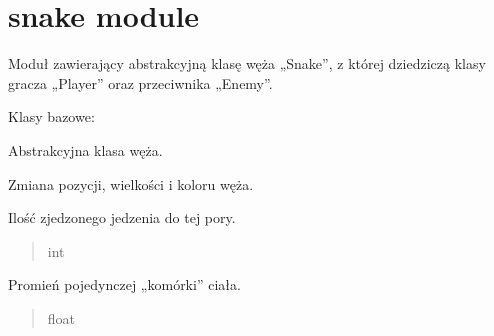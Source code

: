 \documentclass[letterpaper,10pt,polish]{sphinxmanual}
\begin{document}
\sphinxstepscope


\section{snake module}
\label{\detokenize{snake:module-snake}}\label{\detokenize{snake:snake-module}}\label{\detokenize{snake::doc}}
\sphinxAtStartPar
Moduł zawierający abstrakcyjną klasę węża „Snake”, z której dziedziczą klasy
gracza „Player” oraz przeciwnika „Enemy”.

\begin{fulllineitems}
\label{\detokenize{snake:snake.Snake}}
\pysigstartsignatures
{}
\pysigstopsignatures
\sphinxAtStartPar
Klasy bazowe: 

\sphinxAtStartPar
Abstrakcyjna klasa węża.

\sphinxAtStartPar
Zmiana pozycji, wielkości i koloru węża.

\begin{fulllineitems}
\label{\detokenize{snake:snake.Snake.eaten_food}}
\pysigstartsignatures
{}
\pysigstopsignatures
\sphinxAtStartPar
Ilość zjedzonego jedzenia do tej pory.
\begin{quote}\begin{description}
\sphinxAtStartPar
int

\end{description}\end{quote}

\end{fulllineitems}


\begin{fulllineitems}
\label{\detokenize{snake:snake.Snake.body_size}}
\pysigstartsignatures
{}
\pysigstopsignatures
\sphinxAtStartPar
Promień pojedynczej „komórki” ciała.
\begin{quote}\begin{description}
\sphinxAtStartPar
float


\end{description}
\end{quote}
\end{fulllineitems}
\end{fulllineitems}
\end{document}

